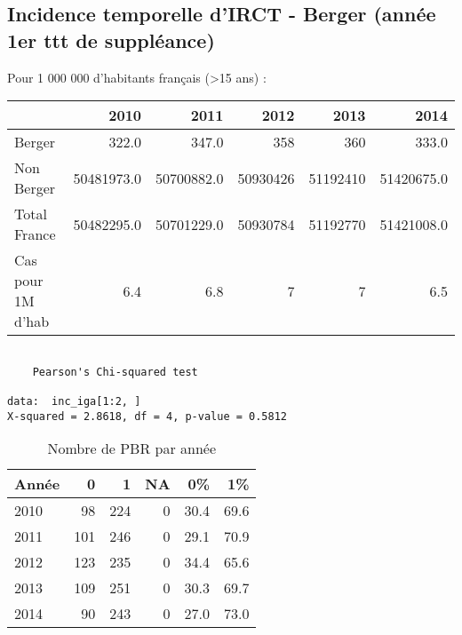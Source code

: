 \documentclass[11pt,a4paper]{article}\usepackage[]{graphicx}\usepackage[]{color}
\makeatletter
\newenvironment{kframe}{%
 \def\at@end@of@kframe{}%
 \ifinner\ifhmode%
  \def\at@end@of@kframe{\end{minipage}}%
  \begin{minipage}{\columnwidth}%
 \fi\fi%
 \def\FrameCommand##1{\hskip\@totalleftmargin \hskip-\fboxsep
 \colorbox{shadecolor}{##1}\hskip-\fboxsep
     \hskip-\linewidth \hskip-\@totalleftmargin \hskip\columnwidth}%
 \MakeFramed {\advance\hsize-\width
   \@totalleftmargin\z@ \linewidth\hsize
   \@setminipage}}%
 {\par\unskip\endMakeFramed%
 \at@end@of@kframe}
\newenvironment{knitrout}{}{} %
\makeatother
\begin{document}
  \subsection{Incidence temporelle d'IRCT - Berger (année 1er ttt de suppléance)}

Pour 1 000 000 d'habitants français (\textgreater 15 ans) :

\begin{table}[H]
\centering
\begin{tabular}{lrrrrr}
  \hline
 & 2010 & 2011 & 2012 & 2013 & 2014 \\ 
  \hline
Berger & 322.0 & 347.0 & 358 & 360 & 333.0 \\ 
  Non Berger & 50481973.0 & 50700882.0 & 50930426 & 51192410 & 51420675.0 \\ 
  Total France & 50482295.0 & 50701229.0 & 50930784 & 51192770 & 51421008.0 \\ 
  Cas pour 1M d'hab & 6.4 & 6.8 & 7 & 7 & 6.5 \\ 
   \hline
\end{tabular}
\end{table}


\begin{knitrout}
\color{fgcolor}\begin{kframe}
\begin{verbatim}

	Pearson's Chi-squared test

data:  inc_iga[1:2, ]
X-squared = 2.8618, df = 4, p-value = 0.5812
\end{verbatim}
\end{kframe}
\end{knitrout}

\begin{table}[H]
\centering
\begin{tabular}{lrrrrr}
  \hline
Année & 0 & 1 & NA & 0\% & 1\% \\ 
  \hline
2010 & 98 & 224 & 0 & 30.4 & 69.6 \\ 
  2011 & 101 & 246 & 0 & 29.1 & 70.9 \\ 
  2012 & 123 & 235 & 0 & 34.4 & 65.6 \\ 
  2013 & 109 & 251 & 0 & 30.3 & 69.7 \\ 
  2014 & 90 & 243 & 0 & 27.0 & 73.0 \\ 
   \hline
\end{tabular}
\caption{Nombre de PBR par année} 
\end{table}
\end{document}
